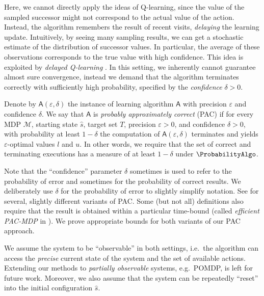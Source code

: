 \documentclass{article}
\newcommand{\MDP}{\mathcal{M}}
\newcommand{\initialstate}{\hat{s}}
\newcommand{\learningalgo}{\mathsf{A}}
\begin{document}
Here, we cannot directly apply the ideas of Q-learning, since the value of the sampled successor might not correspond to the actual value of the action.
Instead, the algorithm remembers the result of recent visits, \emph{delaying} the learning update.
Intuitively, by seeing many sampling results, we can get a stochastic estimate of the distribution of successor values.
In particular, the average of these observations corresponds to the true value with high confidence.
This idea is exploited by \emph{delayed Q-learning} \cite{DBLP:conf/icml/StrehlLWLL06}.
In this setting, we inherently cannot guarantee almost sure convergence, instead we demand that the algorithm terminates correctly with sufficiently high probability, specified by the \emph{confidence} $\delta > 0$.
\begin{definition}
	Denote by $\learningalgo(\varepsilon, \delta)$ the instance of learning algorithm $\learningalgo$ with precision $\varepsilon$ and confidence $\delta$.
	We say that $\learningalgo$ is \emph{probably approximately correct} (PAC) if for every MDP $\MDP$, starting state $\initialstate$, target set $T$, precision $\varepsilon > 0$, and confidence $\delta > 0$, with probability at least $1 - \delta$ the computation of $\learningalgo(\varepsilon, \delta)$ terminates and yields $\varepsilon$-optimal values $l$ and $u$.
	In other words, we require that the set of correct and terminating executions has a measure of at least $1 - \delta$ under $\ProbabilityAlgo$.
\end{definition}
Note that the \enquote{confidence} parameter $\delta$ sometimes is used to refer to the probability of error and sometimes for the probability of correct results.
We deliberately use $\delta$ for the probability of error to slightly simplify notation.
See \cite{DBLP:journals/cacm/Valiant84,DBLP:conf/colt/Angluin88,DBLP:conf/icml/StrehlLWLL06,DBLP:conf/isaim/Strehl08} for several, slightly different variants of PAC.
Some (but not all) definitions also require that the result is obtained within a particular time-bound (called \emph{efficient PAC-MDP} in \cite{DBLP:conf/isaim/Strehl08}).
We prove appropriate bounds for both variants of our PAC approach.
\begin{remark}
	We assume the system to be \enquote{observable} in both settings, i.e.\ the algorithm can access the \emph{precise} current state of the system and the set of available actions.
	Extending our methods to \emph{partially observable} systems, e.g.\ POMDP, is left for future work.
	Moreover, we also assume that the system can be repeatedly \enquote{reset} into the initial configuration $\initialstate$.
\end{remark}
\end{document}
